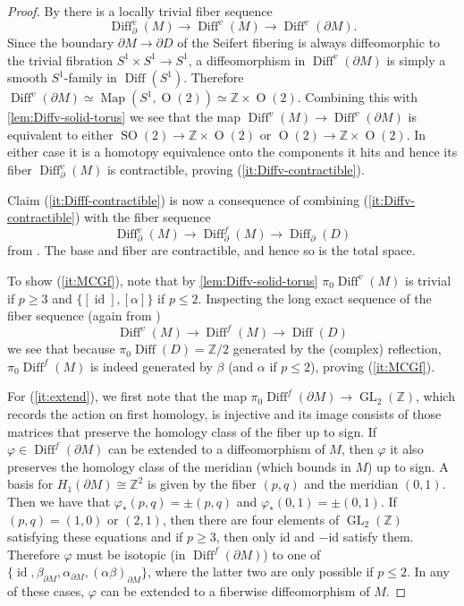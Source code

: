 \documentclass{amsart}
\theoremstyle{plain}
\theoremstyle{definition}
\DeclareMathOperator\Diff{Diff}
\DeclareMathOperator\Map{Map}
\DeclareMathOperator\SO{SO}
\DeclareMathOperator\Or{O}
\DeclareMathOperator\GL{GL}
\DeclareMathOperator{\id}{id}
\newcommand{\bbZ}{\mathbb{Z}}
\begin{document}
\begin{proof}
    By \cite[Corollary 3.8(ii)]{HKMR12} there is a locally trivial fiber sequence
    \[
        \Diff_\partial^v(M) \longrightarrow 
        \Diff^v(M) \longrightarrow 
        \Diff^v(\partial M).
    \]
    Since the boundary $\partial M \to \partial D$ of the Seifert fibering is always diffeomorphic to the trivial fibration $S^1 \times S^1 \to S^1$,
    a diffeomorphism in $\Diff^v(\partial M)$ is simply a smooth $S^1$-family in $\Diff(S^1)$.
    Therefore $\Diff^v(\partial M) \simeq \Map(S^1, \Or(2)) \simeq \bbZ \times \Or(2)$.
    Combining this with \cref{lem:Diffv-solid-torus} we see that the map $\Diff^v(M) \to \Diff^v(\partial M)$ is equivalent to either $\SO(2) \to \bbZ \times \Or(2)$ or $\Or(2) \to \bbZ \times \Or(2)$.
    In either case it is a homotopy equivalence onto the components it hits and hence its fiber $\Diff_\partial^v(M)$ is contractible, proving (\ref{it:Diffv-contractible}).

    Claim (\ref{it:Difff-contractible}) is now a consequence of combining (\ref{it:Diffv-contractible}) with the fiber sequence
    \[
        \Diff_\partial^v(M) \to 
        \Diff_\partial^f(M) \to 
        \Diff_\partial(D)
    \]
     from \cite[Theorem 3.9]{HKMR12}. The base and fiber are contractible, and hence so is the total space.

    To show (\ref{it:MCGf}), note that by \cref{lem:Diffv-solid-torus} $\pi_0\Diff^v(M)$ is trivial if $p\ge 3$ and $\{[\id], [\alpha]\}$ if $p \le 2$.
    Inspecting the long exact sequence of the fiber sequence (again from \cite[Theorem 3.9]{HKMR12})
    \[
        \Diff^v(M) \to 
        \Diff^f(M) \to 
        \Diff(D)
    \]
    we see that because $\pi_0\Diff(D) = \bbZ/2$ generated by the (complex) reflection, $\pi_0\Diff^f(M)$ is indeed generated by $\beta$ (and $\alpha$ if $p \le 2$), proving (\ref{it:MCGf}).

    For (\ref{it:extend}), we first note that 
    the map $\pi_0\Diff^f(\partial M) \to \GL_2(\bbZ)$,
    which records the action on first homology, is injective and its image consists of those matrices that preserve the homology class of the fiber up to sign.
    If $\varphi \in \Diff^f(\partial M)$ can be extended to a diffeomorphism of $M$,
    then $\varphi$ it also preserves the homology class of the meridian (which bounds in $M$) up to sign.
    A basis for $H_1(\partial M) \cong \bbZ^2$ is given by the fiber $(p,q)$ and the meridian $(0,1)$.
    Then we have that $\varphi_*(p,q) = \pm (p,q)$ and $\varphi_*(0,1) = \pm(0,1)$.
    If $(p,q) = (1,0)$ or $(2,1)$, then there are four elements of $\GL_2(\bbZ)$ satisfying these equations and if $p \ge 3$, then only $\mathrm{id}$ and $-\mathrm{id}$ satisfy them.
    Therefore $\varphi$ must be isotopic (in $\Diff^f(\partial M)$) to one of $\{\id, \beta_{\partial M}, \alpha_{\partial M}, (\alpha\beta)_{\partial M}\}$, where the latter two are only possible if $p\le 2$.
    In any of these cases, $\varphi$ can be extended to a fiberwise diffeomorphism of $M$.
\end{proof}
\end{document}
